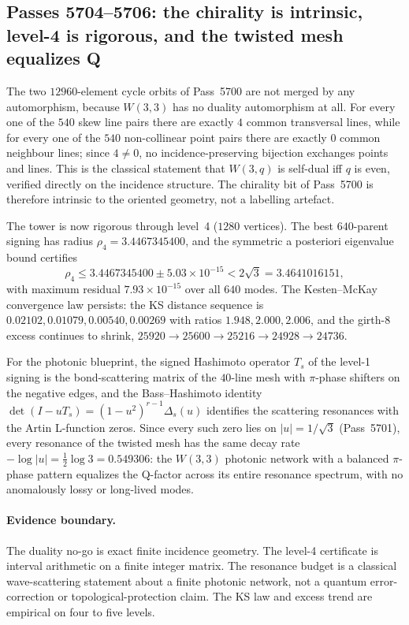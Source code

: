 \subsection*{Passes 5704--5706: the chirality is intrinsic, level-4 is rigorous, and the twisted mesh equalizes Q}

The two $12960$-element cycle orbits of Pass~5700 are not merged by any
automorphism, because $W(3,3)$ has no duality automorphism at all.  For every
one of the $540$ skew line pairs there are exactly $4$ common transversal
lines, while for every one of the $540$ non-collinear point pairs there are
exactly $0$ common neighbour lines; since $4\neq0$, no incidence-preserving
bijection exchanges points and lines.  This is the classical statement that
$W(3,q)$ is self-dual iff $q$ is even, verified directly on the incidence
structure.  The chirality bit of Pass~5700 is therefore intrinsic to the
oriented geometry, not a labelling artefact.

The tower is now rigorous through level~4 ($1280$ vertices).  The best
$640$-parent signing has radius $\rho_4=3.4467345400$, and the symmetric a
posteriori eigenvalue bound certifies
\[
 \rho_4\le 3.4467345400\pm 5.03\times10^{-15}<2\sqrt3=3.4641016151,
\]
with maximum residual $7.93\times10^{-15}$ over all $640$ modes.  The
Kesten--McKay convergence law persists: the KS distance sequence is
$0.02102,0.01079,0.00540,0.00269$ with ratios $1.948,2.000,2.006$, and the
girth-8 excess continues to shrink,
$25920\to25600\to25216\to24928\to24736$.

For the photonic blueprint, the signed Hashimoto operator $T_s$ of the level-1
signing is the bond-scattering matrix of the $40$-line mesh with $\pi$-phase
shifters on the negative edges, and the Bass--Hashimoto identity
$\det(I-uT_s)=(1-u^2)^{r-1}\Delta_s(u)$ identifies the scattering resonances
with the Artin L-function zeros.  Since every such zero lies on
$|u|=1/\sqrt3$ (Pass~5701), every resonance of the twisted mesh has the same
decay rate $-\log|u|=\tfrac12\log3=0.549306$: the $W(3,3)$ photonic network
with a balanced $\pi$-phase pattern equalizes the Q-factor across its entire
resonance spectrum, with no anomalously lossy or long-lived modes.

\paragraph{Evidence boundary.}
The duality no-go is exact finite incidence geometry.  The level-4 certificate
is interval arithmetic on a finite integer matrix.  The resonance budget is a
classical wave-scattering statement about a finite photonic network, not a
quantum error-correction or topological-protection claim.  The KS law and
excess trend are empirical on four to five levels.
